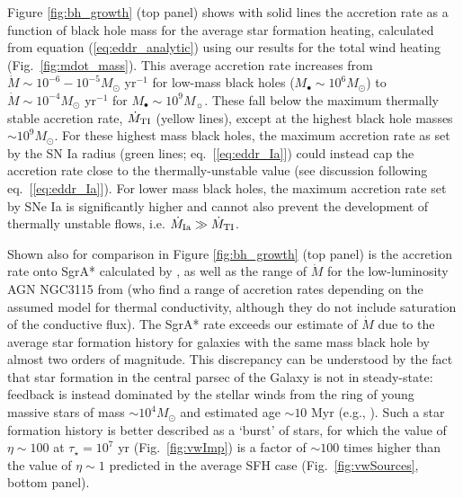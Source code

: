 \documentclass[usenatbib,fleqn]{mn2e}
\begin{document}
Figure \ref{fig:bh_growth} (top panel) shows with solid lines the
accretion rate as a function of black hole mass for the average star
formation heating, calculated from equation (\ref{eq:eddr_analytic})
using our results for the total wind heating
(Fig.~\ref{fig:mdot_mass}).  This average accretion rate increases
from $\dot{M} \sim 10^{-6}-10^{-5}M_{\odot}$ yr$^{-1}$ for low-mass
black holes ($M_{\bullet} \sim 10^{6}M_{\odot}$) to $\dot{M} \sim
10^{-4}M_{\odot}$ yr$^{-1}$ for $M_{\bullet} \sim 10^{9}M_{\sun}$.
These fall below the maximum thermally stable accretion rate,
$\dot{M}_{\rm TI}$ (yellow lines), except at the highest
black hole masses $\sim 10^{9}M_{\odot}$.  For these highest mass
black holes, the maximum accretion rate as set by the SN Ia
radius (green lines; eq.~[\ref{eq:eddr_Ia}]) could instead cap the
accretion rate close to the thermally-unstable value (see discussion following eq.~[\ref{eq:eddr_Ia}]).  For lower mass black holes, the maximum accretion rate set by SNe Ia is significantly higher and cannot
also prevent the development of thermally unstable flows,
i.e. $\dot{M}_{\rm Ia} \gg \dot{M}_{\rm TI}$.

Shown also for comparison in Figure \ref{fig:bh_growth} (top panel) is the accretion rate onto SgrA* calculated by \citet{Quataert:2004a}, as well as the range of $\dot{M}$ for the low-luminosity AGN NGC3115 from \citealt{ShcherbakovWong+:2014a} (who find a range of accretion rates depending on the assumed model for thermal conductivity, although they do not include saturation of the conductive flux).  The SgrA* rate exceeds our estimate of $\dot{M}$ due to the average star formation history for galaxies with the same mass black hole by almost two orders of magnitude.  This discrepancy can be understood by the fact that star formation in the central parsec of the Galaxy is not in steady-state: feedback is instead dominated by the stellar winds from the ring of young massive stars of mass $\sim 10^{4}M_{\odot}$ and estimated age $\sim 10$ Myr (e.g., \citealt{Schodel+07}).  Such a star formation history is better described as a `burst' of stars, for which the value of $\eta \sim 100$ at $\tau_{\star} = 10^{7}$ yr (Fig.~\ref{fig:vwImp}) is a factor of $\sim 100$ times higher than the value of $\eta \sim 1$ predicted in the average SFH case (Fig.~\ref{fig:vwSources}, bottom panel).
\end{document}
